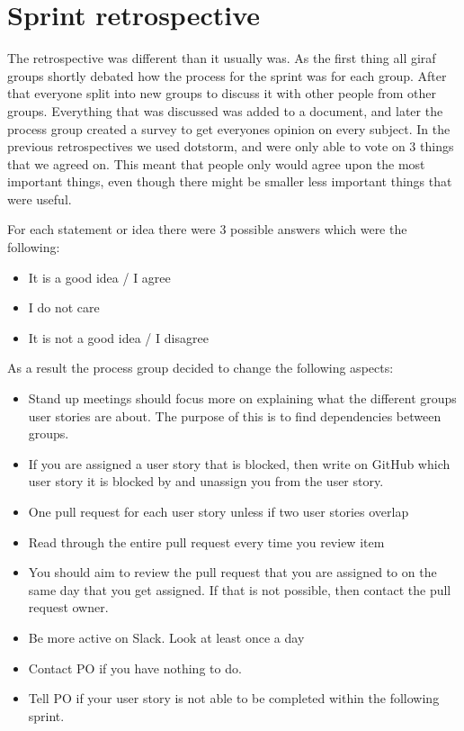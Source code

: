 \section{Sprint retrospective}
The retrospective was different than it usually was. 
As the first thing all giraf groups shortly debated how the process for the sprint was for each group.
After that everyone split into new groups to discuss it with other people from other groups.
Everything that was discussed was added to a document, and later the process group created a survey to get everyones opinion on every subject.
In the previous retrospectives we used dotstorm, and were only able to vote on 3 things that we agreed on.
This meant that people only would agree upon the most important things, even though there might be smaller less important things that were useful.

For each statement or idea there were 3 possible answers which were the following:

\begin{itemize}
    \item It is a good idea / I agree
    \item I do not care
    \item It is not a good idea / I disagree
\end{itemize}

As a result the process group decided to change the following aspects:
\begin{itemize}
    \item Stand up meetings should focus more on explaining what the different groups user stories are about. The purpose of this is to find dependencies between groups.
    \item If you are assigned a user story that is blocked, then write on GitHub which user story it is blocked by and unassign you from the user story.
    \item One pull request for each user story unless if two user stories overlap
    \item Read through the entire pull request every time you review item
    \item You should aim to review the pull request that you are assigned to on the same day that you get assigned. If that is not possible, then contact the pull request owner.
    \item Be more active on Slack. Look at least once a day
    \item Contact PO if you have nothing to do.
    \item Tell PO if your user story is not able to be completed within the following sprint.
\end{itemize}
